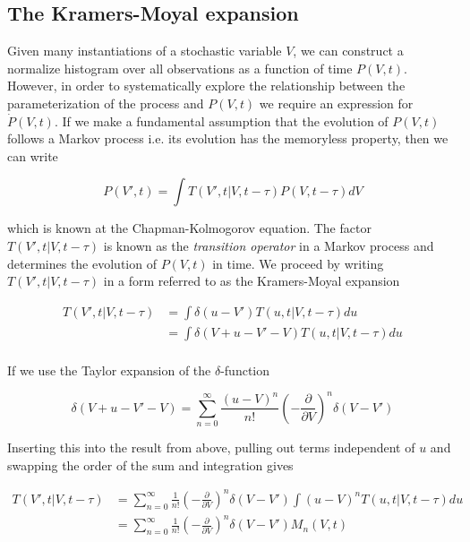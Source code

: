 \documentclass{ucetd}
\begin{document}
\begin{appendices}
\chapter{The Kramers-Moyal expansion}

Given many instantiations of a stochastic variable $V$, we can construct a normalize histogram over all observations as a function of time $P(V,t)$. However, in order to systematically explore the relationship between the parameterization of the process and $P(V,t)$ we require an expression for $\dot{P}(V,t)$. If we make a fundamental assumption that the evolution of $P(V,t)$ follows a Markov process i.e. its evolution has the memoryless property, then we can write

\begin{equation}
P(V', t) = \int T(V', t | V, t-\tau)P(V, t-\tau)dV
\end{equation} 

which is known at the Chapman-Kolmogorov equation. The factor $T(V', t | V, t-\tau)$ is known as the \emph{transition operator} in a Markov process and determines the evolution of $P(V,t)$ in time. We proceed by writing $T(V', t | V, t-\tau)$ in a form referred to as the Kramers-Moyal expansion

\begin{align*}
T(V', t | V, t-\tau) &= \int \delta(u-V')T(u, t | V, t-\tau)du\\
&= \int \delta(V+u-V'-V)T(u, t | V, t-\tau)du\\
\end{align*} 

If we use the Taylor expansion of the $\delta$-function 

\begin{equation*}
\delta(V+u-V'-V) = \sum_{n=0}^{\infty} \frac{(u-V)^{n}}{n!}\left(-\frac{\partial}{\partial V}\right)^{n}\delta(V-V')
\end{equation*}

Inserting this into the result from above, pulling out terms independent of $u$ and swapping the order of the sum and integration gives

\begin{align}
T(V', t | V, t-\tau) &= \sum_{n=0}^{\infty} \frac{1}{n!}\left(-\frac{\partial}{\partial V}\right)^{n}\delta(V-V')\int(u-V)^{n}T(u, t | V, t-\tau)du\\
&= \sum_{n=0}^{\infty} \frac{1}{n!}\left(-\frac{\partial}{\partial V}\right)^{n}\delta(V-V')M_{n}(V,t)
\end{align} 


\end{appendices}
\end{document}

